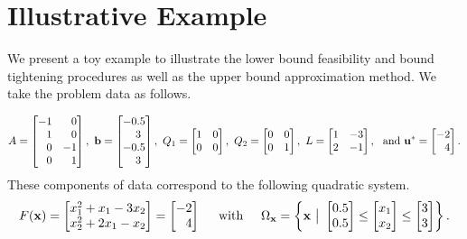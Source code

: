 \section{Illustrative Example} \label{sec:expl}

We present a toy example to illustrate the lower bound feasibility and bound tightening procedures as well as the upper bound approximation method.
We take the problem data as follows.

\[
A=
\begin{bmatrix}
  -1 & \p 0  \\ 
\p 1 & \p 0  \\  
\p 0 & -1 \\
\p 0 & \p 1  
\end{bmatrix},%
~
\vb =
\begin{bmatrix}
  -0.5  \\ 
\p 3 \\  
  -0.5 \\
\p 3  
\end{bmatrix}, %
~
Q_1=
\begin{bmatrix}
  1 & 0  \\ 
  0 & 0  
\end{bmatrix},%
~
Q_2=
\begin{bmatrix}
  0 & 0  \\ 
  0 & 1  
\end{bmatrix},%
~
L=
\begin{bmatrix}
  1 & -3  \\ 
  2 & -1  
\end{bmatrix}, %
~\mbox{ and }
\vu^*=
\begin{bmatrix}
  -2  \\ 
\p 4   
\end{bmatrix}.%
\]
%
These components of data correspond to the following quadratic system.
\[
F(\vx) =
\begin{bmatrix}
  x_1^2 +   x_1 - 3x_2 \\
  x_2^2 +  2x_1 - x_2
\end{bmatrix}
=
\begin{bmatrix}
    -2 \\
    \p 4
\end{bmatrix}
\hspace*{0.15in}
\text{ with }
\hspace*{0.15in}
\Omega_{\vx} = \left\{ \vx ~\big\vert~
\begin{bmatrix}
  0.5 \\
  0.5
\end{bmatrix}
\leq 
\begin{bmatrix}
  x_1 \\
  x_2
\end{bmatrix}
\leq
\begin{bmatrix}
  3 \\
  3
\end{bmatrix}
\right\}.
\]
